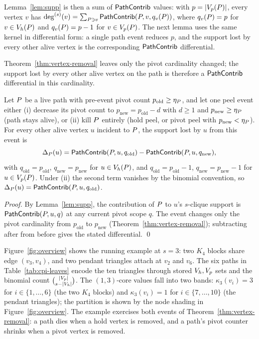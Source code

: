 Lemma~\ref{lem:supp} is then a sum of ${\mathsf{PathContrib}}$ values: with $p=|\Vp(\TPath)|$, every vertex $v$ has $\sdeg(v)=\sum_{\TPath\ni v}\pathContrib(\TPath,v,q_v(\TPath))$, where $q_v(\TPath)=p$ for $v\in\Vh(\TPath)$ and $q_v(\TPath)=p-1$ for $v\in\Vp(\TPath)$.
%
The next lemma uses the same kernel in differential form: a single path event reduces $p$, and the support lost by every other alive vertex is the corresponding ${\mathsf{PathContrib}}$ differential.

Theorem~\ref{thm:vertex-removal} leaves only the pivot cardinality changed; the support lost by every other alive vertex on the path is therefore a ${\mathsf{PathContrib}}$ differential in this cardinality.

\begin{lemma}\label{lem:support-delta}
Let $\TPath$ be a live path with pre-event pivot count $p_{\mathrm{old}}\ge\eta_{\TPath}$, and let one peel event either (i) decrease its pivot count to $p_{\mathrm{new}}=p_{\mathrm{old}}-d$ with $d\ge1$ and $p_{\mathrm{new}}\ge\eta_{\TPath}$ (path stays alive), or (ii) kill $\TPath$ entirely (hold peel, or pivot peel with $p_{\mathrm{new}}<\eta_{\TPath}$).
%
For every other alive vertex $u$ incident to $\TPath$, the support lost by $u$ from this event is
\[
  \Delta_{\TPath}(u)=\pathContrib(\TPath,u,q_{\mathrm{old}})-\pathContrib(\TPath,u,q_{\mathrm{new}}),
\]
with $q_{\mathrm{old}}=p_{\mathrm{old}}$, $q_{\mathrm{new}}=p_{\mathrm{new}}$ for $u\in\Vh(\TPath)$, and $q_{\mathrm{old}}=p_{\mathrm{old}}-1$, $q_{\mathrm{new}}=p_{\mathrm{new}}-1$ for $u\in\Vp(\TPath)$.
%
Under (ii) the second term vanishes by the binomial convention, so $\Delta_{\TPath}(u)=\pathContrib(\TPath,u,q_{\mathrm{old}})$.
\end{lemma}

\begin{proof}
By Lemma~\ref{lem:supp}, the contribution of $\TPath$ to $u$'s $s$-clique support is $\pathContrib(\TPath,u,q)$ at any current pivot scope $q$.
%
The event changes only the pivot cardinality from $p_{\mathrm{old}}$ to $p_{\mathrm{new}}$ (Theorem~\ref{thm:vertex-removal}); subtracting after from before gives the stated differential.
%
\qed
\end{proof}

Figure~\ref{fig:overview} shows the running example at $s=3$: two $K_4$ blocks share edge $(v_3,v_4)$, and two pendant triangles attach at $v_2$ and $v_6$.
%
The six \cpi{} paths in Table~\ref{tab:cpi-leaves} encode the ten triangles through stored $V_h,V_p$ sets and the binomial count $\binom{|V_p|}{s-|V_h|}$.
%
The $(1,3)$-core values fall into two bands: $\kappa_3(v_i)\!=\!3$ for $i\!\in\!\{1,\ldots,6\}$ (the two $K_4$ blocks) and $\kappa_3(v_i)\!=\!1$ for $i\!\in\!\{7,\ldots,10\}$ (the pendant triangles); the partition is shown by the node shading in Figure~\ref{fig:overview}.
%
The example exercises both events of Theorem~\ref{thm:vertex-removal}: a path dies when a hold vertex is removed, and a path's pivot counter shrinks when a pivot vertex is removed.

